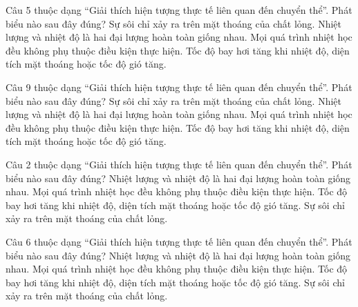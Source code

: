 \begin{ex}
Câu 5 thuộc dạng “Giải thích hiện tượng thực tế liên quan đến chuyển thể”. Phát biểu nào sau đây đúng?
\choice
{Sự sôi chỉ xảy ra trên mặt thoáng của chất lỏng.}
{Nhiệt lượng và nhiệt độ là hai đại lượng hoàn toàn giống nhau.}
{Mọi quá trình nhiệt học đều không phụ thuộc điều kiện thực hiện.}
{\True Tốc độ bay hơi tăng khi nhiệt độ, diện tích mặt thoáng hoặc tốc độ gió tăng.}
\end{ex}

\begin{ex}
Câu 9 thuộc dạng “Giải thích hiện tượng thực tế liên quan đến chuyển thể”. Phát biểu nào sau đây đúng?
\choice
{Sự sôi chỉ xảy ra trên mặt thoáng của chất lỏng.}
{Nhiệt lượng và nhiệt độ là hai đại lượng hoàn toàn giống nhau.}
{Mọi quá trình nhiệt học đều không phụ thuộc điều kiện thực hiện.}
{\True Tốc độ bay hơi tăng khi nhiệt độ, diện tích mặt thoáng hoặc tốc độ gió tăng.}
\end{ex}


\begin{ex}
Câu 2 thuộc dạng “Giải thích hiện tượng thực tế liên quan đến chuyển thể”. Phát biểu nào sau đây đúng?
\choice
{Nhiệt lượng và nhiệt độ là hai đại lượng hoàn toàn giống nhau.}
{Mọi quá trình nhiệt học đều không phụ thuộc điều kiện thực hiện.}
{\True Tốc độ bay hơi tăng khi nhiệt độ, diện tích mặt thoáng hoặc tốc độ gió tăng.}
{Sự sôi chỉ xảy ra trên mặt thoáng của chất lỏng.}
\end{ex}


\begin{ex}
Câu 6 thuộc dạng “Giải thích hiện tượng thực tế liên quan đến chuyển thể”. Phát biểu nào sau đây đúng?
\choice
{Nhiệt lượng và nhiệt độ là hai đại lượng hoàn toàn giống nhau.}
{Mọi quá trình nhiệt học đều không phụ thuộc điều kiện thực hiện.}
{\True Tốc độ bay hơi tăng khi nhiệt độ, diện tích mặt thoáng hoặc tốc độ gió tăng.}
{Sự sôi chỉ xảy ra trên mặt thoáng của chất lỏng.}
\end{ex}

